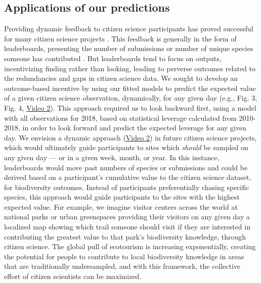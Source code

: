 \documentclass[9pt,twocolumn,twoside,lineno]{pnas-new}
\begin{document}
\subsection*{Applications of our predictions}
Providing dynamic feedback to citizen science participants has proved successful for many citizen science projects \cite{rowley2019frogid, wiggins2011conservation, xue2016avicaching}. This feedback is generally in the form of leaderboards, presenting the number of submissions or number of unique species someone has contributed \cite{wood2011ebird}. But leaderboards tend to focus on outputs, incentivizing finding rather than looking, leading to perverse outcomes related to the redundancies and gaps in citizen science data. We sought to develop an outcome-based incentive by using our fitted models to predict the expected value of a given citizen science observation, dynamically, for any given day (e.g., Fig. 3, Fig. 4, \href{https://github.com/coreytcallaghan/optimize_citizen_science_obs/blob/master/Figures/dynamic_map.gif}{Video 2}). This approach required us to look backward first, using a model with all observations for 2018, based on statistical leverage calculated from 2010-2018, in order to look forward and predict the expected leverage for any given day. We envision a dynamic approach (\href{https://github.com/coreytcallaghan/optimize_citizen_science_obs/blob/master/Figures/dynamic_map.gif}{Video 2}) in future citizen science projects, which would ultimately guide participants to sites which \textit{should} be sampled on any given day --- or in a given week, month, or year. In this instance, leaderboards would move past numbers of species or submissions and could be derived based on a participant's cumulative value to the citizen science dataset, for biodiversity outcomes. Instead of participants preferentially chasing specific species, this approach would guide participants to the sites with the highest expected value. For example, we imagine visitor centers across the world at national parks or urban greenspaces providing their visitors on any given day a localized map showing which trail someone should visit if they are interested in contributing the greatest value to that park's biodiversity knowledge, through citizen science. The global pull of ecotourism \cite{sharpley2006ecotourism} is increasing exponentially, creating the potential for people to contribute to local biodiversity knowledge in areas that are traditionally undersampled, and with this framework, the collective effort of citizen scientists can be maximized.
\end{document}

